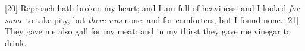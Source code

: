 [20] \textcolor[cmyk]{0.99998,1,0,0}{Reproach hath broken my heart; and I am full of heaviness: and I looked \emph{for} \emph{some} to take pity, but \emph{there} \emph{was} none; and for comforters, but I found none.} %
[21] \textcolor[cmyk]{0.99998,1,0,0}{They gave me also gall for my meat; and in my thirst they gave me vinegar to drink.} %
